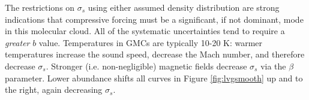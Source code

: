 The restrictions on $\sigma_s$ using either assumed density distribution are
strong indications that compressive forcing must be a significant, if not
dominant, mode in this molecular cloud.  
All of the systematic uncertainties tend to require a \emph{greater} $b$
value.  Temperatures in GMCs are typically 10-20 K: warmer temperatures
increase the sound speed, decrease the Mach number, and therefore decrease
$\sigma_s$.  Stronger (i.e. non-negligible) magnetic fields decrease
$\sigma_s$ via the $\beta$ parameter.  Lower abundance shifts all curves in
Figure \ref{fig:lvgsmooth} up and to the right, again decreasing $\sigma_s$.



% 

% 

